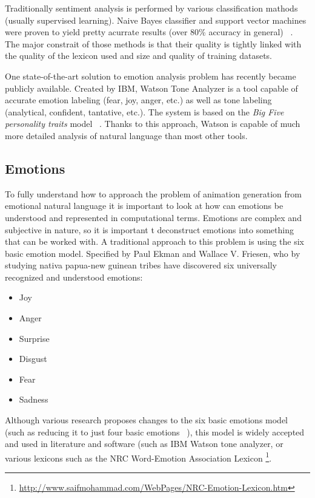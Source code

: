Traditionally sentiment analysis is performed by various classification mathods (usually supervised learning). Naive Bayes classifier and support vector machines were proven to yield pretty acurrate results (over 80\% accuracy in general) ~\cite{sentimentanal1}. The major constrait of those methods is that their quality is tightly linked with the quality of the lexicon used and size and quality of training datasets.

One state-of-the-art solution to emotion analysis problem has recently became publicly available. Created by IBM, Watson Tone Analyzer is a tool capable of accurate emotion labeling (fear, joy, anger, etc.) as well as tone labeling (analytical, confident, tantative, etc.). The system is based on the \textit{Big Five personality traits} model ~\cite{watson}. Thanks to this approach, Watson is capable of much more detailed analysis of natural language than most other tools.


\subsection{Emotions}
To fully understand how to approach the problem of animation generation from emotional natural language it is important to look at how can emotions be understood and represented in computational terms. Emotions are complex and subjective in nature, so it is important t deconstruct emotions into something that can be worked with. A traditional approach to this problem is using the six basic emotion model. Specified by Paul Ekman and Wallace V. Friesen, who by studying nativa papua-new guinean tribes have discovered six universally recognized and understood emotions: ~\cite{basicemo}
\begin{itemize}
\item Joy
\item Anger
\item Surprise
\item Disgust
\item Fear
\item Sadness
\end{itemize}

Although various research proposes changes to the six basic emotions model (such as reducing it to just four basic emotions ~\cite{fouremo}), this model is widely accepted and used in literature and software (such as IBM Watson tone analyzer, or various lexicons such as the NRC Word-Emotion Association Lexicon \footnote{\url{http://www.saifmohammad.com/WebPages/NRC-Emotion-Lexicon.htm}}.

